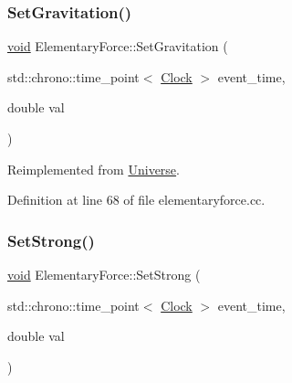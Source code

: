\mbox{\label{class_elementary_force_aa36d5875964f7e2fc981f6fc5431be7f}} 
\subsubsection{\texorpdfstring{Set\+Gravitation()}{SetGravitation()}}
{\footnotesize\ttfamily \mbox{\hyperlink{glad_8h_a950fc91edb4504f62f1c577bf4727c29}{void}} Elementary\+Force\+::\+Set\+Gravitation (\begin{DoxyParamCaption}\item[{std\+::chrono\+::time\+\_\+point$<$ \mbox{\hyperlink{universe_8h_a0ef8d951d1ca5ab3cfaf7ab4c7a6fd80}{Clock}} $>$}]{event\+\_\+time,  }\item[{double}]{val }\end{DoxyParamCaption})\hspace{0.3cm}{\ttfamily [virtual]}}



Reimplemented from \mbox{\hyperlink{class_universe_ae0cb8d86b2fbb8396d605160344b42f5}{Universe}}.



Definition at line 68 of file elementaryforce.\+cc.

\mbox{\label{class_elementary_force_aa1b5708cfab2069049fec5c924e1f246}} 
\subsubsection{\texorpdfstring{Set\+Strong()}{SetStrong()}}
{\footnotesize\ttfamily \mbox{\hyperlink{glad_8h_a950fc91edb4504f62f1c577bf4727c29}{void}} Elementary\+Force\+::\+Set\+Strong (\begin{DoxyParamCaption}\item[{std\+::chrono\+::time\+\_\+point$<$ \mbox{\hyperlink{universe_8h_a0ef8d951d1ca5ab3cfaf7ab4c7a6fd80}{Clock}} $>$}]{event\+\_\+time,  }\item[{double}]{val }\end{DoxyParamCaption})\hspace{0.3cm}{\ttfamily [virtual]}}



